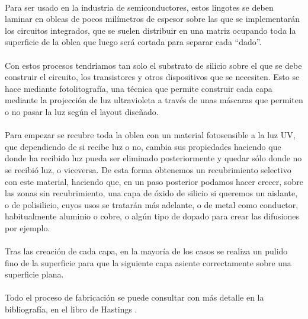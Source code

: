 \paragraph{}
Para ser usado en la industria de semiconductores, estos lingotes se deben laminar
en obleas de pocos milímetros de espesor sobre las que se implementarán los
circuitos integrados, que se suelen distribuir en una matriz ocupando toda la
superficie de la oblea que luego será cortada para separar cada ``dado''.

\paragraph{}
Con estos procesos tendríamos tan solo el substrato de silicio sobre el que
se debe construir el circuito, los transistores y otros dispositivos que se
necesiten. Esto se hace mediante fotolitografía, una técnica que permite
construir cada capa mediante la projección de luz ultravioleta a través de
unas máscaras que permiten o no pasar la luz según el layout diseñado.

\paragraph{}
Para empezar se recubre toda la oblea con un material fotosensible a la luz UV,
que dependiendo de si recibe luz o no, cambia sus propiedades haciendo que donde
ha recibido luz pueda ser eliminado posteriormente y quedar sólo donde no se recibió
luz, o viceversa. De esta forma obtenemos un recubrimiento selectivo con este
material, haciendo que, en un paso posterior podamos hacer crecer, sobre las zonas
sin recubrimiento, una capa de óxido de silicio si queremos un aislante, o de polisilicio,
cuyos usos se tratarán más adelante, o de metal como conductor, habitualmente
aluminio o cobre, o algún tipo de dopado para crear las difusiones por ejemplo.

\paragraph{}
Tras las creación de cada capa, en la mayoría de los casos se realiza un pulido
fino de la superficie para que la siguiente capa asiente correctamente sobre una
superficie plana.

\paragraph{}
Todo el proceso de fabricación se puede consultar con más detalle en la bibliografía,
en el libro de Hastings \cite{Hastings2001:fabrication}.

